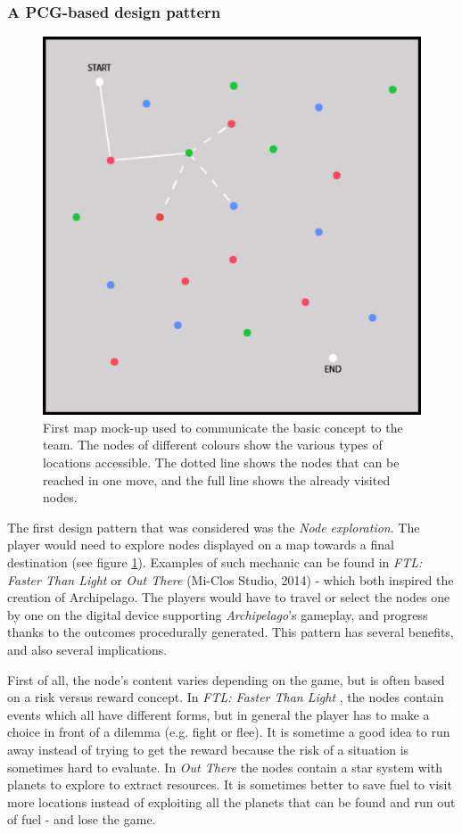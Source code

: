 \subsubsection{A PCG-based design pattern}
\begin{figure}[!ht]
    \centering
    \includegraphics[scale=0.4]{Images/protomap.png}
    \caption{First map mock-up used to communicate the basic concept to the team. The nodes of different colours show the various types of locations accessible. The dotted line shows the nodes that can be reached in one move, and the full line shows the already visited nodes.}
    \label{fig:map}
\end{figure}
The first design pattern that was considered  was the \textit{Node exploration}. The player would need to explore nodes displayed on a map towards a final destination (see figure \ref{fig:map}). Examples of such mechanic can be found in \textit{FTL: Faster Than Light} \cite{game:ftl} or \textit{Out There} (Mi-Clos Studio, 2014) \cite{game:outthere} - which both inspired the creation of Archipelago. The players would have to travel or select the nodes one by one on the digital device supporting  \textit{Archipelago}'s gameplay, and progress thanks to the outcomes procedurally generated. This pattern has several benefits, and also several implications. 

First of all, the node's content varies depending on the game, but is often based on a risk versus reward concept. In \textit{FTL: Faster Than Light} \cite{game:ftl}, the nodes contain events which all have different forms, but in general the player has to make a choice in front of a dilemma (e.g. fight or flee). It is sometime a good idea to run away instead of trying to get the reward because the risk of a situation is sometimes hard to evaluate. In \textit{Out There} \cite{game:outthere} the nodes contain a star system with planets to explore to extract resources. It is sometimes better to save fuel to visit more locations instead of exploiting all the planets that can be found and run out of fuel - and lose the game.  

